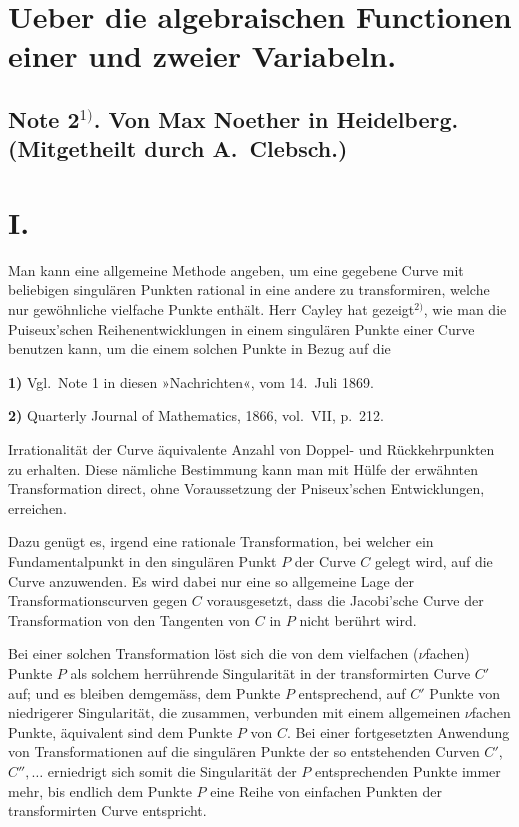 \documentclass{article}
\begin{document}

\section*{Ueber die algebraischen Functionen einer und zweier Variabeln.}

\subsection*{Note 2${}^{1)}$. Von Max Noether in Heidelberg. (Mitgetheilt durch A.~Clebsch.)}

\section*{I.}

Man kann eine allgemeine Methode angeben, um eine gegebene Curve mit beliebigen singulären Punkten rational in eine andere zu transformiren, welche nur gewöhnliche vielfache Punkte enthält. Herr Cayley hat gezeigt${}^{2)}$, wie man die Puiseux'schen Reihenentwicklungen in einem singulären Punkte einer Curve benutzen kann, um die einem solchen Punkte in Bezug auf die

\textbf{1)} Vgl.\ Note 1 in diesen »Nachrichten«, vom 14.\ Juli 1869.

\textbf{2)} Quarterly Journal of Mathematics, 1866, vol.\ VII, p.\ 212.

Irrationalität der Curve äquivalente Anzahl von Doppel- und Rückkehrpunkten zu erhalten. Diese nämliche Bestimmung kann man mit Hülfe der erwähnten Transformation direct, ohne Voraussetzung der Pniseux'schen Entwicklungen, erreichen.

Dazu genügt es, irgend eine rationale Transformation, bei welcher ein Fundamentalpunkt in den singulären Punkt $P$ der Curve $C$ gelegt wird, auf die Curve anzuwenden. Es wird dabei nur eine so allgemeine Lage der Transformationscurven gegen $C$ vorausgesetzt, dass die Jacobi'sche Curve der Transformation von den Tangenten von $C$ in $P$ nicht berührt wird.

Bei einer solchen Transformation löst sich die von dem vielfachen ($\nu$fachen) Punkte $P$ als solchem herrührende Singularität in der transformirten Curve $C'$ auf; und es bleiben demgemäss, dem Punkte $P$ entsprechend, auf $C'$ Punkte von niedrigerer Singularität, die zusammen, verbunden mit einem allgemeinen $\nu$fachen Punkte, äquivalent sind dem Punkte $P$ von $C$. Bei einer fortgesetzten Anwendung von Transformationen auf die singulären Punkte der so entstehenden Curven $C'$, $C'', \ldots$ erniedrigt sich somit die Singularität der $P$ entsprechenden Punkte immer mehr, bis endlich dem Punkte $P$ eine Reihe von einfachen Punkten der transformirten Curve entspricht.
\end{document}
